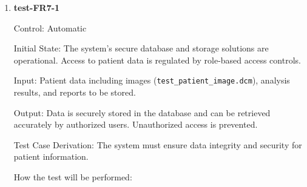 \documentclass[12pt, titlepage]{article}
\begin{document}
\begin{enumerate}

  \item \textbf{test-FR7-1} \label{test-FR7-1}

  Control: Automatic
  
  Initial State: The system's secure database and storage solutions are operational. Access to patient data is regulated by role-based access controls.
  
  Input: Patient data including images (\texttt{test\_patient\_image.dcm}), analysis results, and reports to be stored.
  
  Output: Data is securely stored in the database and can be retrieved accurately by authorized users. Unauthorized access is prevented.
  
  Test Case Derivation: The system must ensure data integrity and security for patient information.
  
  How the test will be performed:
  

\end{enumerate}
\end{document}
